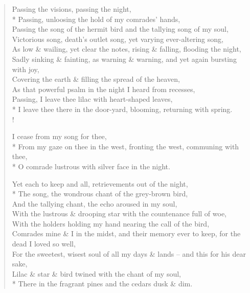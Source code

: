 \documentclass[MAIN]{subfiles}
\begin{document}
\begin{verse}
Passing the visions, passing the night,\\*
Passing, unloosing the hold of my comrades' hands,\\
Passing the song of the hermit bird and the tallying song of my soul,\\
Victorious song, death's outlet song, yet varying ever-altering song,\\
As low \& wailing, yet clear the notes, rising \& falling, flooding the night,\\
Sadly sinking \& fainting, as warning \& warning, and yet again bursting with joy,\\
Covering the earth \& filling the spread of the heaven,\\
As that powerful psalm in the night I heard from recesses,\\
Passing, I leave thee lilac with heart-shaped leaves,\\*
I leave thee there in the door-yard, blooming, returning with spring.\\!

I cease from my song for thee,\\*
From my gaze on thee in the west, fronting the west, communing with thee,\\*
O comrade lustrous with silver face in the night.

Yet each to keep and all, retrievements out of the night,\\*
The song, the wondrous chant of the grey-brown bird,\\
And the tallying chant, the echo aroused in my soul,\\
With the lustrous \& drooping star with the countenance full of woe,\\
With the holders holding my hand nearing the call of the bird,\\
Comrades mine \& I in the midst, and their memory ever to keep, for the dead I loved so well,\\
For the sweetest, wisest soul of all my days \& lands -- and this for his dear sake,\\
Lilac \& star \& bird twined with the chant of my soul,\\*
There in the fragrant pines and the cedars dusk \& dim.
\end{verse}
\end{document}
